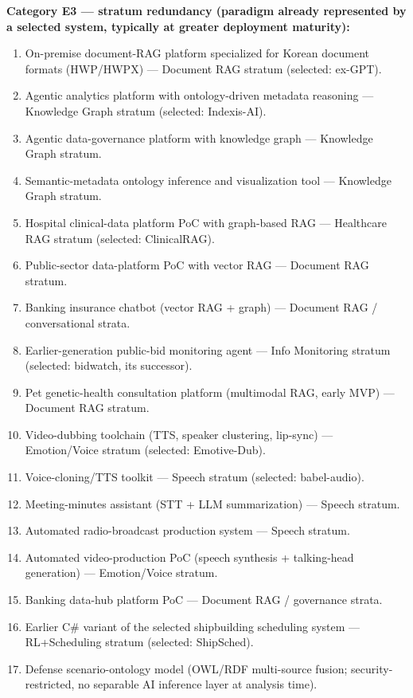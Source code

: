 \documentclass[10pt,a4paper]{article}
\begin{document}
\textbf{Category E3 --- stratum redundancy (paradigm already represented by a selected system, typically at greater deployment maturity):}
\begin{enumerate}[leftmargin=*,itemsep=1pt,resume]
\item On-premise document-RAG platform specialized for Korean document formats (HWP/HWPX) --- Document RAG stratum (selected: ex-GPT).
\item Agentic analytics platform with ontology-driven metadata reasoning --- Knowledge Graph stratum (selected: Indexis-AI).
\item Agentic data-governance platform with knowledge graph --- Knowledge Graph stratum.
\item Semantic-metadata ontology inference and visualization tool --- Knowledge Graph stratum.
\item Hospital clinical-data platform PoC with graph-based RAG --- Healthcare RAG stratum (selected: ClinicalRAG).
\item Public-sector data-platform PoC with vector RAG --- Document RAG stratum.
\item Banking insurance chatbot (vector RAG + graph) --- Document RAG / conversational strata.
\item Earlier-generation public-bid monitoring agent --- Info Monitoring stratum (selected: bidwatch, its successor).
\item Pet genetic-health consultation platform (multimodal RAG, early MVP) --- Document RAG stratum.
\item Video-dubbing toolchain (TTS, speaker clustering, lip-sync) --- Emotion/Voice stratum (selected: Emotive-Dub).
\item Voice-cloning/TTS toolkit --- Speech stratum (selected: babel-audio).
\item Meeting-minutes assistant (STT + LLM summarization) --- Speech stratum.
\item Automated radio-broadcast production system --- Speech stratum.
\item Automated video-production PoC (speech synthesis + talking-head generation) --- Emotion/Voice stratum.
\item Banking data-hub platform PoC --- Document RAG / governance strata.
\item Earlier C\# variant of the selected shipbuilding scheduling system --- RL+Scheduling stratum (selected: ShipSched).
\item Defense scenario-ontology model (OWL/RDF multi-source fusion; security-restricted, no separable AI inference layer at analysis time).
\end{enumerate}
\end{document}
